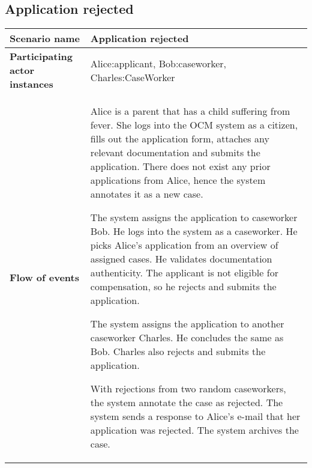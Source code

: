 \subsection*{Application rejected}
\begin{table}[htb!]
\begin{tabularx}{\textwidth}{l|X}
	\textbf{Scenario name} & Application rejected \\
	\hline
	\textbf{Participating actor instances} & Alice:applicant, Bob:caseworker, Charles:CaseWorker\\
	\hline
	\textbf{Flow of events} &
	\begin{compactenum}
	       \item Alice is a parent that has a child suffering from fever. She logs into the OCM system as a citizen, fills out the application form, attaches any relevant documentation and submits the application. There does not exist any prior applications from Alice, hence the system annotates it as a new case.
           \item  The system assigns the application to caseworker Bob. He logs into the system as a caseworker. He picks Alice's application from an overview of assigned cases. He validates documentation authenticity. The applicant is not eligible for compensation, so he rejects and submits the application.
           \item The system assigns the application to another caseworker Charles. He concludes the same as Bob. Charles also rejects and submits the application.
	        \item With rejections from two random caseworkers, the system annotate the case as rejected. The system sends a response to Alice's e-mail that her application was rejected. The system archives the case.
	\end{compactenum}\\
	\hline
\end{tabularx}
\end{table}

\newpage
